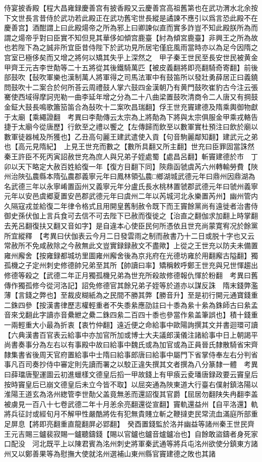 侍宴披香殿【程大昌雍録慶善宫有披香殿又云慶善宫高祖舊第也在武功渭水北余按下文世長言昔侍於武功若此殿正在武功舊宅世長縱是譎諫不應引以爲言恐此殿不在慶善宫】酒酣謂上曰此殿煬帝之所為邪上曰卿諫似直而實多詐豈不知此殿朕所為而謂之煬帝乎對曰臣實不知但見其華侈如傾宫鹿臺【紂為傾宮鹿臺】非興王之所為故也若陛下為之誠非所宜臣昔侍陛下於武功見所居宅僅庇風雨當時亦以為足今因隋之宫室已極侈矣而又增之將何以矯其失乎上深然之　甲子秦王世民至長安世民被黄金甲齊王元吉李世勣等二十五將從其後鐵騎萬匹【被皮義翻將即亮翻騎奇寄翻】前後部鼓吹【鼔吹軍樂也漢制萬人將軍得之司馬法軍中有鼓笛所以發壯勇薛居正曰義鐃問鼓吹十二案合於何所荅云周禮鼓人掌六鼓四金漢朝乃有黄門鼓吹崔豹古今注云張騫使西域得摩訶兜勒一曲李延年增之分為二十八曲梁置鼓吹清商令二人唐又有掆鼓金鉦大鼓長鳴歌簫笳笛合為鼔吹十二案吹昌瑞翻】俘王世充竇建德及隋乘輿御物獻于太廟【乘繩證翻　考異曰李勣傳云太宗為上將勣為下將與太宗俱服金甲乘戎輅告捷于太廟今從唐歷】行飲至之禮以饗之【左傳歸而飲至以數軍實杜預注曰飲於廟以數軍徒器械及所獲也】乙丑高句麗王建武遣使入貢【句音駒麗鄰知翻】建武元之弟也【高元見隋紀】　上見王世充而數之【數所具翻又所主翻】世充曰臣罪固當誅然秦王許臣不死丙寅詔赦世充為庶人與兄弟子姪處蜀【處昌呂翻】斬竇建德於市　丁卯以天下略定大赦百姓給復一年【復方目翻下同】陝鼎函虢虞芮六州轉輸勞費【陜州治陜弘農縣本隋弘農郡義寧元年曰鳳林領弘農□鄉湖城武德元年曰鼎州因鼎湖為名武德三年以永寧崤置函州又義寧元年分盧氏長水桃林置虢郡武德元年曰虢州義寧元年以安邑虞郷夏置安邑郡武德元年曰虞州二年以芮城河北永樂置芮州】幽州管内久隔寇戎並給復二年律令格式且用開皇舊制赦令既下而王竇餘黨尚有遠徙者治書侍御史孫伏伽上言兵食可去信不可去陛下已赦而復徙之【治直之翻伽求加翻上時掌翻去羌呂翻復扶又翻又音如字】是自違本心使臣民何所憑依且世充尚蒙寛宥况於餘黨所宜縱釋　【考異曰伏伽表云今月二日發雲雨之制而赦書乃十二日或脱十字也又云常赦所不免咸赦除之今赦無此文豈實録録赦文不盡歟】上從之王世充以防夫未備置雍州廨舍【按雍録都城坊里圖雍州廨舍後為京兆府在光德坊雍於用翻廨古隘翻】獨孤機之子定州刺史修德帥兄弟至其所【帥讀曰率】矯稱敕呼鄭王世充與兄世惲趨出修德等殺之【武德二年正月獨孤機兄弟為世充所殺故修德報仇惲於粉翻　考異曰舊傳作獨孤修今從河洛記】詔免修德官其餘兄弟子姪等於道亦以謀反誅　隋末錢弊濫薄【言錢之弊也】至裁皮糊紙為之民間不勝其弊【勝音升】至是初行開元通寶錢重二銖四參【按漢書律歷志權輕重者不失黍絫應劭註曰十黍為絫十絫為銖師古曰絫孟音來戈翻此字讀亦音纍紲之纍二銖四絫二百四十黍也參當作絫盖筆誤也】積十錢重一兩輕重大小最為折衷【衷竹仲翻】遠近便之命給事中歐陽詢撰其文并書迴環可讀【六典漢書百官表云給事中亦加官所加或博士大夫議郎漢儀注諸給事中日上朝謁平尚書奏事分為左右以有事殿中故曰給事中魏氏或為加官或為正員晉氏隸散騎省宋齊隸集書省後周天官府置給事中士隋曰給事郎唐曰給事中屬門下省掌侍奉左右分判省事凡百司奏抄侍中審定則先讀而署之以駮正違失撰其文者撰為八分篆隸一體　考異曰薛璫唐聖運圖云初進蠟樣文德皇后搯一甲故錢上有甲㾗云夌璠唐録政要云竇皇后按時竇皇后已崩文德皇后未立今皆不取】以屈突通為陜東道大行臺右僕射鎮洛陽以淮陽王道玄為洛州緫管李世勣父盖竟無恙而還詔復其官爵【屈居勿翻陕失冉翻李盖被虜見一百八十七卷武德二年十月恙余亮翻還從宣翻】竇軌還益州【自平洛還】軌將兵征討或經旬月不解甲性嚴酷將佐有犯無貴賤立斬之鞭撻吏民常流血滿庭所部重足屏息【將即亮翻重直龍翻屏必郢翻】　癸酉置錢監於洛并幽益等諸州秦王世民齊王元吉賜三鑪裴寂賜一鑪聽鑄錢【賜以官鑪也鑪音爐鑪冶也】自餘敢盜鑄者身死家口配没　河北既平上以陳君賓為洺州刺史將軍秦武通等將兵屯洺州欲使分鎮東方諸州又以鄭善果等為慰撫大使就洺州選補山東州縣官竇建德之敗也其諸